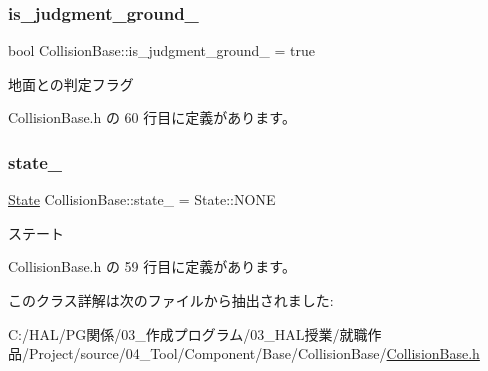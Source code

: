 \mbox{\label{class_collision_base_acc56eed7a6366d77bb2b80810f0a4ea7}} 
\subsubsection{\texorpdfstring{is\+\_\+judgment\+\_\+ground\+\_\+}{is\_judgment\_ground\_}}
{\footnotesize\ttfamily bool Collision\+Base\+::is\+\_\+judgment\+\_\+ground\+\_\+ = true\hspace{0.3cm}{\ttfamily [private]}}



地面との判定フラグ 



 Collision\+Base.\+h の 60 行目に定義があります。

\mbox{\label{class_collision_base_a00000e1adbe3869939c8119a4ae830d0}} 
\subsubsection{\texorpdfstring{state\+\_\+}{state\_}}
{\footnotesize\ttfamily \mbox{\hyperlink{class_collision_base_a4dd1ed00099a19c0176913af93c4e365}{State}} Collision\+Base\+::state\+\_\+ = State\+::\+N\+O\+NE\hspace{0.3cm}{\ttfamily [private]}}



ステート 



 Collision\+Base.\+h の 59 行目に定義があります。



このクラス詳解は次のファイルから抽出されました\+:\begin{DoxyCompactItemize}
\item 
C\+:/\+H\+A\+L/\+P\+G関係/03\+\_\+作成プログラム/03\+\_\+\+H\+A\+L授業/就職作品/\+Project/source/04\+\_\+\+Tool/\+Component/\+Base/\+Collision\+Base/\mbox{\hyperlink{_collision_base_8h}{Collision\+Base.\+h}}\end{DoxyCompactItemize}
